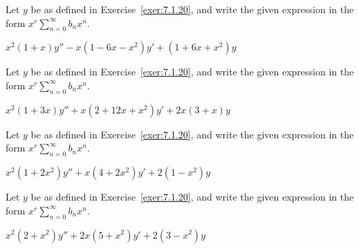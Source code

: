 \documentclass{ximera}
\begin{document}
\begin{problem}\label{exer:7.1.23}
Let $y$ be as defined in Exercise~\ref{exer:7.1.20}, and write the given
expression in the form $x^r\sum_{n=0}^\infty b_nx^n$.

$x^2(1+x)y''-x(1-6x-x^2)y'+(1+6x+x^2)y$
\end{problem}

\begin{problem}\label{exer:7.1.24}
Let $y$ be as defined in Exercise~\ref{exer:7.1.20}, and write the given
expression in the form $x^r\sum_{n=0}^\infty b_nx^n$.

$x^2(1+3x)y''+x(2+12x+x^2)y'+2x(3+x)y$
\end{problem}

\begin{problem}\label{exer:7.1.25}
Let $y$ be as defined in Exercise~\ref{exer:7.1.20}, and write the given
expression in the form $x^r\sum_{n=0}^\infty b_nx^n$.

$x^2(1+2x^2)y''+x(4+2x^2)y'+2(1-x^2)y$
\end{problem}

\begin{problem}\label{exer:7.1.26}
Let $y$ be as defined in Exercise~\ref{exer:7.1.20}, and write the given expression in the form $x^r\sum_{n=0}^\infty b_nx^n$.

$x^2(2+x^2)y''+2x(5+x^2)y'+2(3-x^2)y$
\end{problem}
\end{document}
